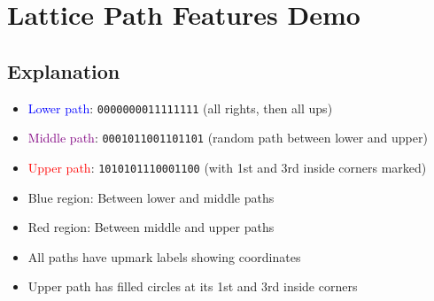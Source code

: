 \documentclass{article}
\begin{document}
\section*{Lattice Path Features Demo}

\begin{center}
\end{center}

\subsection*{Explanation}
\begin{itemize}
  \item \textcolor{blue}{Lower path}: \texttt{0000000011111111} (all rights, then all ups)
  \item \textcolor{purple}{Middle path}: \texttt{0001011001101101} (random path between lower and upper)
  \item \textcolor{red}{Upper path}: \texttt{1010101110001100} (with 1st and 3rd inside corners marked)
  \item \textcolor{blue!50}{Blue region}: Between lower and middle paths
  \item \textcolor{red!50}{Red region}: Between middle and upper paths
  \item All paths have upmark labels showing coordinates
  \item Upper path has filled circles at its 1st and 3rd inside corners
\end{itemize}
\end{document}
